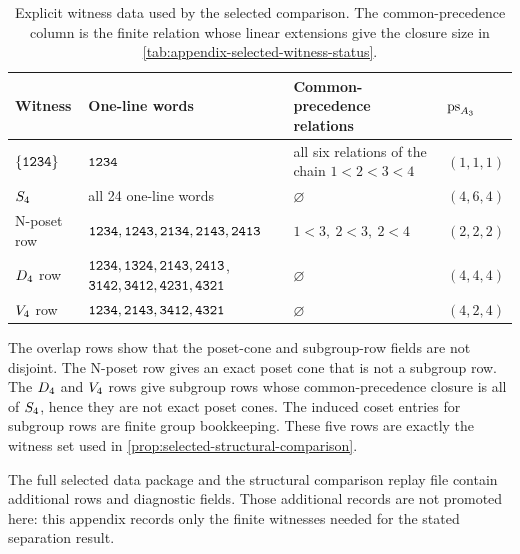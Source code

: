 \begin{table}[htbp]
\centering
\small
\begin{tabular}{@{}p{}p{}p{}p{}@{}}
\toprule
Witness & One-line words & Common-precedence relations & \(\operatorname{ps}_{A_3}\) \\
\midrule
\(\{\texttt{1234}\}\) & \(\texttt{1234}\) & all six relations of the chain \(1<2<3<4\) & \((1,1,1)\) \\
\(S_4\) & all 24 one-line words & \(\varnothing\) & \((4,6,4)\) \\
N-poset row & \(\texttt{1234},\texttt{1243},\texttt{2134},\texttt{2143},\texttt{2413}\) & \(1<3,\ 2<3,\ 2<4\) & \((2,2,2)\) \\
\(D_4\) row & \(\texttt{1234},\texttt{1324},\texttt{2143},\texttt{2413}\), \(\texttt{3142},\texttt{3412},\texttt{4231},\texttt{4321}\) & \(\varnothing\) & \((4,4,4)\) \\
\(V_4\) row & \(\texttt{1234},\texttt{2143},\texttt{3412},\texttt{4321}\) & \(\varnothing\) & \((4,2,4)\) \\
\bottomrule
\end{tabular}
\caption{Explicit witness data used by the selected comparison. The common-precedence column is the finite relation whose linear extensions give the closure size in \cref{tab:appendix-selected-witness-status}.}
\label{tab:appendix-selected-witness-data}
\end{table}

The overlap rows show that the poset-cone and subgroup-row fields are not disjoint. The N-poset row gives an exact poset cone that is not a subgroup row. The \(D_4\) and \(V_4\) rows give subgroup rows whose common-precedence closure is all of \(S_4\), hence they are not exact poset cones. The induced coset entries for subgroup rows are finite group bookkeeping. These five rows are exactly the witness set used in \cref{prop:selected-structural-comparison}.

The full selected data package and the structural comparison replay file contain additional rows and diagnostic fields. Those additional records are not promoted here: this appendix records only the finite witnesses needed for the stated separation result.
